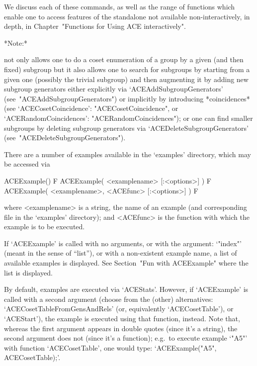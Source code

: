 We discuss each of these commands, as well as the range  of  functions
which enable one to access  features  of  the  {\ACE}  standalone  not
available non-interactively, in depth, in Chapter~"Functions for Using
ACE interactively".

*Note:*

{\ACE} not only allows one to do a coset enumeration of a group  by  a
given (and then fixed) subgroup but it also allows one to  search  for
subgroups by starting from a given one (possibly the trivial subgroup)
and then augmenting  it  by  adding  new  subgroup  generators  either
explicitly               via                `ACEAddSubgroupGenerators'
(see~"ACEAddSubgroupGenerators")   or   implicitly   by    introducing
*coincidences* (see `ACECosetCoincidence':  "ACECosetCoincidence",  or
`ACERandomCoincidences': "ACERandomCoincidences");  or  one  can  find
smaller   subgroups    by    deleting    subgroup    generators    via
`ACEDeleteSubgroupGenerators' (see~"ACEDeleteSubgroupGenerators").


There are a number of examples available in the `examples'  directory,
which may be accessed via

\>ACEExample() F
\>ACEExample( <examplename> [:<options>] ) F
\>ACEExample( <examplename>, <ACEfunc> [:<options>] ) F

where  <examplename>  is  a  string,  the  name  of  an  example  (and
corresponding file in the `examples' directory); and <ACEfunc> is  the
{\ACE} function with which the example is to be executed. 

If `ACEExample' is called with no arguments,  or  with  the  argument:
`"index"' (meant in the sense of ``list''),  or  with  a  non-existent
example  name,  a  list  of  available  examples  is  displayed.   See
Section~"Fun with ACEExample" where the list is displayed.

By  default,  examples  are  executed  via  `ACEStats'.  However,   if
`ACEExample' is called with a second argument (choose from the (other)
alternatives:   `ACECosetTableFromGensAndRels'    (or,    equivalently
`ACECosetTable'), or `ACEStart'), the example is executed  using  that
function, instead. Note that, whereas the first  argument  appears  in
double quotes (since it's a string),  the  second  argument  does  not
(since it's a function); e.g.~to execute example `"A5"' with  function
`ACECosetTable', one would type: `ACEExample("A5", ACECosetTable);'.

